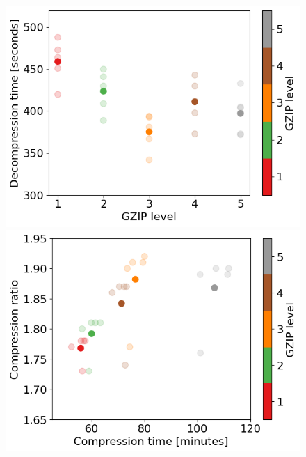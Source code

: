 \documentclass[10pt, a4paper]{article}
\begin{document}
\begin{figure}[H]
    \centering
    \includegraphics[scale=0.55]{gzip_decomptime.png}
    \includegraphics[scale=0.55]{comptime_compratio.png}
    \caption{}
    \label{}
\end{figure}
\end{document}
